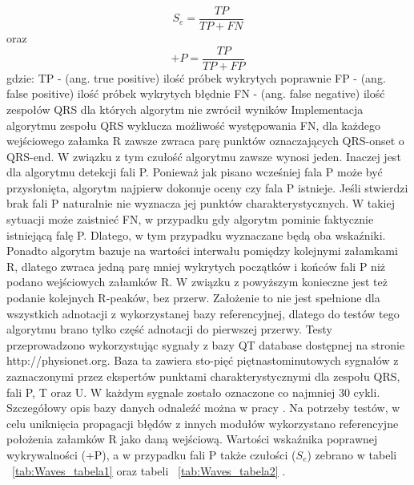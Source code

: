 \begin{equation} \label{eq:Waves_Se}
S_e=\frac{TP}{TP+FN}
\end{equation}
oraz
\begin{equation} \label{eq:Waves_plusP}
+P=\frac{TP}{TP+FP}
\end{equation}
gdzie: \newline
TP - (ang. true positive) ilość próbek wykrytych poprawnie \newline
FP - (ang. false positive) ilość próbek wykrytych błędnie \newline
FN - (ang. false negative) ilość zespołów QRS dla których algorytm nie zwrócił wyników \newline
Implementacja algorytmu zespołu QRS wyklucza możliwość występowania FN, dla każdego wejściowego załamka R zawsze zwraca parę punktów oznaczających QRS-onset o QRS-end. W związku z tym czułość algorytmu zawsze wynosi jeden. Inaczej jest dla algorytmu detekcji fali P. Ponieważ jak pisano wcześniej fala P może być przysłonięta, algorytm najpierw dokonuje oceny czy fala P istnieje. Jeśli stwierdzi brak fali P naturalnie nie wyznacza jej punktów charakterystycznych. W takiej sytuacji może zaistnieć FN, w przypadku gdy algorytm pominie  faktycznie istniejącą falę P. Dlatego, w tym przypadku wyznaczane będą oba wskaźniki. Ponadto algorytm bazuje na wartości interwału pomiędzy kolejnymi załamkami R, dlatego zwraca jedną parę mniej wykrytych początków i końców fali P niż podano wejściowych załamków R. W związku z powyższym konieczne jest też podanie kolejnych R-peaków, bez przerw. Założenie to nie jest spełnione dla wszystkich adnotacji z wykorzystanej bazy referencyjnej, dlatego do testów tego algorytmu brano tylko część adnotacji do pierwszej przerwy.   
Testy przeprowadzono wykorzystując sygnały z bazy QT database dostępnej na stronie http://physionet.org. Baza ta zawiera sto-pięć piętnastominutowych sygnałów z zaznaczonymi przez ekspertów punktami charakterystycznymi dla zespołu QRS, fali P, T oraz U. W każdym sygnale zostało oznaczone co najmniej 30 cykli. Szczegółowy opis bazy danych odnaleźć można w pracy \cite{Waves_aDfEoAfMoQaOWIitE}. Na potrzeby testów, w celu uniknięcia propagacji błędów z innych modułów wykorzystano referencyjne położenia załamków R jako daną wejściową. Wartości wskaźnika poprawnej wykrywalności (+P), a w przypadku fali P także czułości ($S_e$) zebrano w tabeli ~\ref{tab:Waves_tabela1} oraz tabeli ~\ref{tab:Waves_tabela2} .

